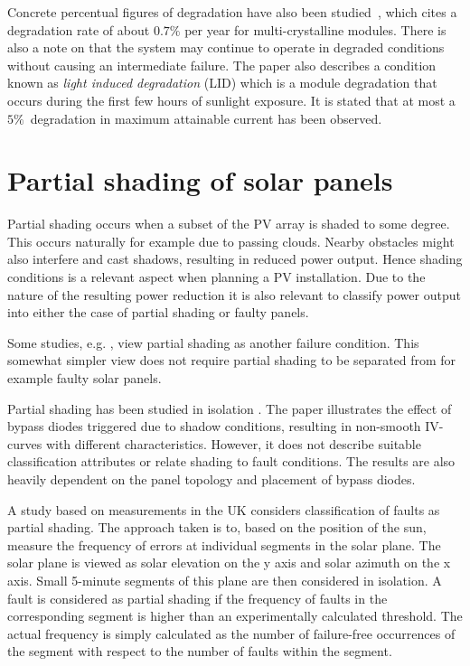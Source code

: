 Concrete percentual figures of degradation have also been studied~\cite{Quintana2002}, which cites a degradation rate of about $0.7\%$ per year for multi-crystalline modules.
There is also a note on that the system may continue to operate in degraded conditions without causing an intermediate failure.
The paper also describes a condition known as \emph{light induced degradation} (LID) which is a module degradation
that occurs during the first few hours of sunlight exposure.
It is stated that at most a $5\%$ degradation in maximum attainable current has been observed.

\section{Partial shading of solar panels}
Partial shading occurs when a subset of the PV array is shaded to some degree.
This occurs naturally for example due to passing clouds.
Nearby obstacles might also interfere and cast shadows, resulting in reduced power output.
Hence shading conditions is a relevant aspect when planning a PV installation.
Due to the nature of the resulting power reduction it is also relevant to classify power output into either the case of partial shading or faulty panels.

Some studies, e.g. \cite{Stettler2005}, view partial shading as another failure condition.
This somewhat simpler view does not require partial shading to be separated from for example faulty solar panels.

Partial shading has been studied in isolation \cite{Alsayid2013}.
The paper illustrates the effect of bypass diodes triggered due to shadow conditions, resulting in non-smooth IV-curves with different characteristics.
However, it does not describe suitable classification attributes or relate shading to fault conditions.
The results are also heavily dependent on the panel topology and placement of bypass diodes.

A study based on measurements in the UK \cite{Firth2010} considers classification of faults as partial shading.
The approach taken is to, based on the position of the sun, measure the frequency of errors at individual segments in the solar plane.
The solar plane is viewed as solar elevation on the y axis and solar azimuth on the x axis.
Small 5-minute segments of this plane are then considered in isolation.
A fault is considered as partial shading if the frequency of faults in the corresponding segment is higher than an experimentally calculated threshold.
The actual frequency is simply calculated as the number of failure-free occurrences of the segment with respect to the number of faults within the segment.

